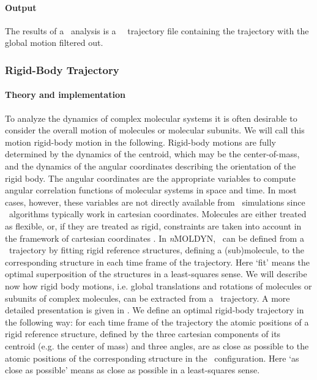 \documentclass[a4paper,11pt]{report}
\newcommand{\NMOLDYN}{\textit{n}MOLDYN}
\begin{document}
\paragraph{Output\\}
The results of a \GMFT\ analysis is a \MMTK\ \NetCDF\ trajectory file containing the trajectory with the global motion filtered 
out.

\subsubsection{Rigid-Body Trajectory}
\label{rbt}
\paragraph{Theory and implementation\\}
\label{rbt_theory}
To analyze the dynamics of complex molecular systems it is often desirable to consider the overall motion of 
molecules or molecular subunits. We will call this motion rigid-body motion in the following. Rigid-body motions 
are fully determined by the dynamics of the centroid, which may be the center-of-mass, and the dynamics of the
angular coordinates describing the orientation of the rigid body. The angular coordinates are the appropriate 
variables to compute angular correlation functions of molecular systems in space and time. In most cases, however, 
these variables are not directly available from \MD\ simulations since \MD\ algorithms typically work in cartesian coordinates. 
Molecules are either treated as flexible, or, if they are treated as rigid, constraints are taken into account in the 
framework of cartesian coordinates \cite{Berendsen}. In \NMOLDYN, \RBT\ can be defined from a 
\MD\ trajectory by fitting rigid reference structures, defining a (sub)molecule, to the corresponding structure in each time 
frame of the trajectory. Here `fit' means the optimal superposition of the structures in a least-squares sense. We will 
describe now how rigid body motions, i.e. global translations and rotations of molecules or  subunits of complex molecules, 
can be extracted from a \MD\ trajectory. A more detailed presentation is given in \cite{Kneller:1991}. We define 
an optimal rigid-body trajectory in the following way: for each time frame of the trajectory the atomic positions of a rigid 
reference structure, defined by the three cartesian components of its centroid (e.g. the center of mass) and three angles, are as 
close as possible to the atomic positions of the corresponding structure in  the \MD\ configuration. Here `as close as possible' means as close 
as possible in a least-squares sense.  
\end{document}
